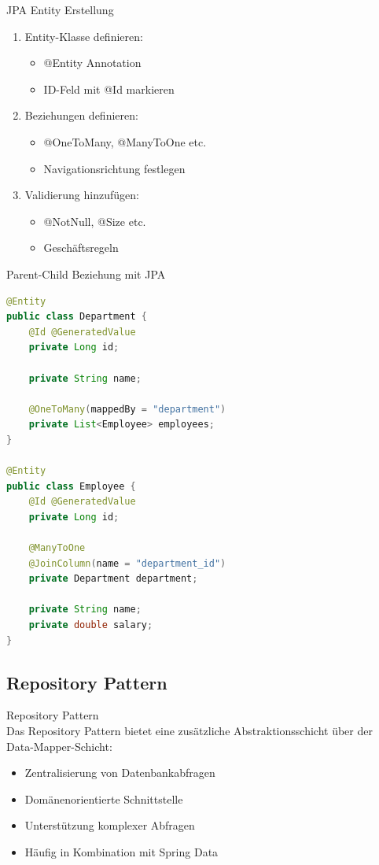 \begin{KR}{JPA Entity Erstellung}
\begin{enumerate}
    \item Entity-Klasse definieren:
    \begin{itemize}
        \item @Entity Annotation
        \item ID-Feld mit @Id markieren
    \end{itemize}
    \item Beziehungen definieren:
    \begin{itemize}
        \item @OneToMany, @ManyToOne etc.
        \item Navigationsrichtung festlegen
    \end{itemize}
    \item Validierung hinzufügen:
    \begin{itemize}
        \item @NotNull, @Size etc.
        \item Geschäftsregeln
    \end{itemize}
\end{enumerate}
\end{KR}

\begin{example}{Parent-Child Beziehung mit JPA}
\begin{lstlisting}[language=Java, style=base]
@Entity
public class Department {
    @Id @GeneratedValue
    private Long id;
    
    private String name;
    
    @OneToMany(mappedBy = "department")
    private List<Employee> employees;
}

@Entity
public class Employee {
    @Id @GeneratedValue
    private Long id;
    
    @ManyToOne
    @JoinColumn(name = "department_id")
    private Department department;
    
    private String name;
    private double salary;
}
\end{lstlisting}
\end{example}

\subsection{Repository Pattern}

\begin{concept}{Repository Pattern}\\
Das Repository Pattern bietet eine zusätzliche Abstraktionsschicht über der Data-Mapper-Schicht:
\begin{itemize}
    \item Zentralisierung von Datenbankabfragen
    \item Domänenorientierte Schnittstelle
    \item Unterstützung komplexer Abfragen
    \item Häufig in Kombination mit Spring Data
\end{itemize}
\end{concept}

